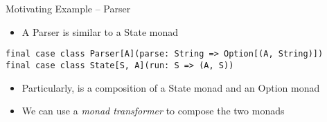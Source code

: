 \documentclass[presentation, 10pt]{beamer}\mode<presentation>{\usetheme{metropolis}}
\begin{document}
\begin{frame}[fragile]{Motivating Example -- Parser}
\begin{itemize}
	\item A Parser is similar to a State monad
\end{itemize}
\begin{tcolorbox}
\begin{verbatim}
final case class Parser[A](parse: String => Option[(A, String)]) 
final case class State[S, A](run: S => (A, S))
\end{verbatim}
\end{tcolorbox}
\begin{itemize}
	\item Particularly, is a composition of a State monad and an Option monad
	\item We can use a \emph{monad transformer} to compose the two monads
\end{itemize}
\end{frame}
\end{document}
